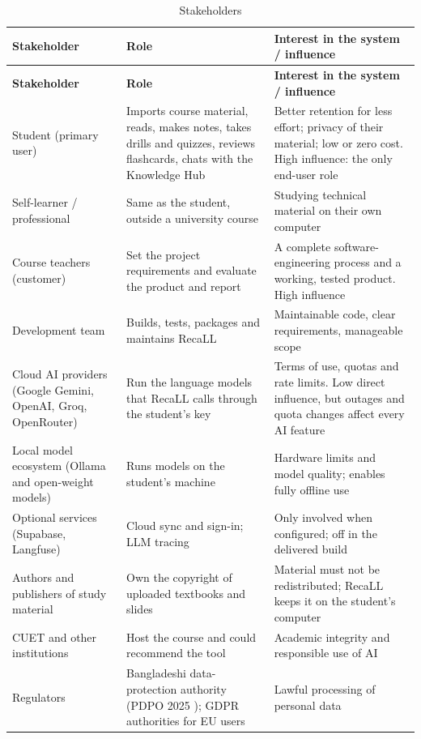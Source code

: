 \begin{small}
\begin{longtable}{@{}>{\raggedright\arraybackslash}p{3.0cm} >{\raggedright\arraybackslash}p{5.4cm} >{\raggedright\arraybackslash}p{5.6cm}@{}}
\caption{Stakeholders}\label{tab:stakeholders}\\
\toprule
\textbf{Stakeholder} & \textbf{Role} & \textbf{Interest in the system / influence}\\
\midrule
\endfirsthead
\toprule
\textbf{Stakeholder} & \textbf{Role} & \textbf{Interest in the system / influence}\\
\midrule
\endhead
\bottomrule
\endfoot
Student (primary user) & Imports course material, reads, makes notes, takes drills and
quizzes, reviews flashcards, chats with the Knowledge Hub & Better retention for less effort;
privacy of their material; low or zero cost. High influence: the only end-user role\\
Self-learner / professional & Same as the student, outside a university course & Studying
technical material on their own computer\\
Course teachers (customer) & Set the project requirements and evaluate the
product and report & A complete software-engineering process and a working, tested product.
High influence\\
Development team & Builds, tests, packages and maintains RecaLL & Maintainable code, clear
requirements, manageable scope\\
Cloud AI providers (Google Gemini, OpenAI, Groq, OpenRouter) & Run the language models that
RecaLL calls through the student's key & Terms of use, quotas and rate limits. Low direct
influence, but outages and quota changes affect every AI feature\\
Local model ecosystem (Ollama and open-weight models) & Runs models on the student's machine &
Hardware limits and model quality; enables fully offline use\\
Optional services (Supabase, Langfuse) & Cloud sync and sign-in; LLM tracing & Only involved
when configured; off in the delivered build\\
Authors and publishers of study material & Own the copyright of uploaded textbooks and
slides & Material must not be redistributed; RecaLL keeps it on the student's computer\\
CUET and other institutions & Host the course and could recommend the tool & Academic
integrity and responsible use of AI\\
Regulators & Bangladeshi data-protection authority (PDPO 2025 \cite{pdpo2025}); GDPR
authorities for EU users \cite{gdpr2016} & Lawful processing of personal data\\
\end{longtable}
\end{small}

